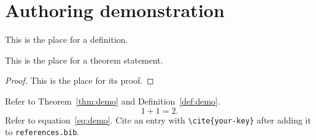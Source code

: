 \chapter{Authoring demonstration}\label{chap:demo}
\begin{definition}\label{def:demo}
This is the place for a definition.
\end{definition}
\begin{theorem}\label{thm:demo}
This is the place for a theorem statement.
\end{theorem}
\begin{proof}
This is the place for its proof.
\end{proof}
Refer to Theorem~\ref{thm:demo} and Definition~\ref{def:demo}.
\begin{equation}\label{eq:demo}
  1+1=2.
\end{equation}
Refer to equation~\eqref{eq:demo}. Cite an entry with \verb|\cite{your-key}|
after adding it to \texttt{references.bib}.
